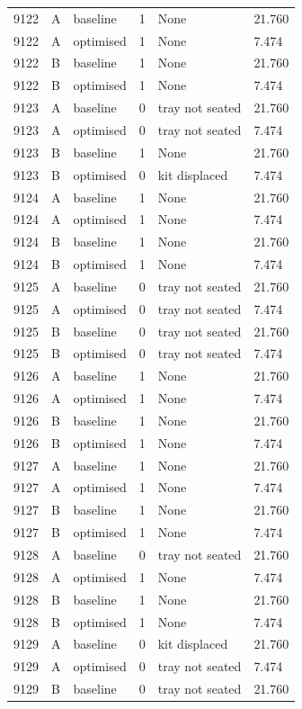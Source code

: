 \begin{longtable}{llllll}
9122 & A & baseline & 1 & None & 21.760 \\
9122 & A & optimised & 1 & None & 7.474 \\
9122 & B & baseline & 1 & None & 21.760 \\
9122 & B & optimised & 1 & None & 7.474 \\
9123 & A & baseline & 0 & tray not seated & 21.760 \\
9123 & A & optimised & 0 & tray not seated & 7.474 \\
9123 & B & baseline & 1 & None & 21.760 \\
9123 & B & optimised & 0 & kit displaced & 7.474 \\
9124 & A & baseline & 1 & None & 21.760 \\
9124 & A & optimised & 1 & None & 7.474 \\
9124 & B & baseline & 1 & None & 21.760 \\
9124 & B & optimised & 1 & None & 7.474 \\
9125 & A & baseline & 0 & tray not seated & 21.760 \\
9125 & A & optimised & 0 & tray not seated & 7.474 \\
9125 & B & baseline & 0 & tray not seated & 21.760 \\
9125 & B & optimised & 0 & tray not seated & 7.474 \\
9126 & A & baseline & 1 & None & 21.760 \\
9126 & A & optimised & 1 & None & 7.474 \\
9126 & B & baseline & 1 & None & 21.760 \\
9126 & B & optimised & 1 & None & 7.474 \\
9127 & A & baseline & 1 & None & 21.760 \\
9127 & A & optimised & 1 & None & 7.474 \\
9127 & B & baseline & 1 & None & 21.760 \\
9127 & B & optimised & 1 & None & 7.474 \\
9128 & A & baseline & 0 & tray not seated & 21.760 \\
9128 & A & optimised & 1 & None & 7.474 \\
9128 & B & baseline & 1 & None & 21.760 \\
9128 & B & optimised & 1 & None & 7.474 \\
9129 & A & baseline & 0 & kit displaced & 21.760 \\
9129 & A & optimised & 0 & tray not seated & 7.474 \\
9129 & B & baseline & 0 & tray not seated & 21.760 \\

\end{longtable}
